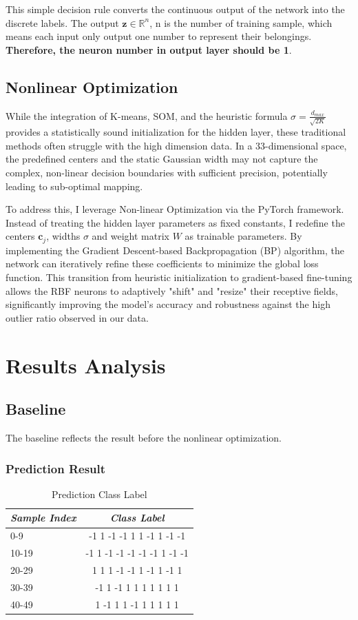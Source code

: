 \documentclass[a4paper, 12pt, twoside]{article}
\begin{document}
This simple decision rule converts the continuous output of the network into the 
discrete labels. The output $\mathbf{z} \in \mathbb{R}^{n}$, n is the number of training 
sample, which means each input only output one number to represent their 
belongings. \textbf{Therefore, the neuron number in output layer should be 1}.

\subsection{Nonlinear Optimization}
While the integration of K-means, SOM, and the heuristic formula 
$\sigma=\frac{d_{max}}{\sqrt{2K}}$
provides a statistically sound initialization for the hidden layer, 
these traditional methods often struggle with the high dimension data. 
In a 33-dimensional space, the predefined centers and the static Gaussian width may not capture the complex, non-linear decision boundaries with sufficient precision, potentially leading to sub-optimal mapping.

To address this, I leverage Non-linear Optimization via the PyTorch framework. 
Instead of treating the hidden layer parameters as fixed constants, I redefine 
the centers $\mathbf{c}_j$, widths $\sigma$ and weight matrix $W$
as trainable parameters. By implementing the Gradient Descent-based 
Backpropagation (BP) algorithm, the network can iteratively refine these 
coefficients to minimize the global loss function. This transition from heuristic 
initialization to gradient-based fine-tuning allows the RBF neurons to adaptively 
"shift" and "resize" their receptive fields, significantly improving the model's 
accuracy and robustness against the high outlier ratio observed in our data.
\section{Results Analysis}
\subsection{Baseline}
The baseline reflects the result before the nonlinear optimization.
\subsubsection{Prediction Result}
\begin{table}[H]
    \centering
    \caption{Prediction Class Label}
    \begin{tabular}{|l|c|}
        \hline
        \textit{Sample Index}&\textit{Class Label}\\
        \hline
        0-9   & -1  1 -1 -1  1  1 -1  1 -1 -1\\
        \hline
        10-19 & -1  1 -1 -1 -1 -1 -1  1 -1 -1\\
        \hline
        20-29 &  1  1  1 -1 -1  1 -1  1 -1  1\\
        \hline
        30-39 & -1  1 -1  1  1  1  1  1  1  1\\
        \hline
        40-49 &  1 -1  1  1 -1  1  1  1  1  1\\
        \hline
    \end{tabular}
\end{table}
\end{document}
